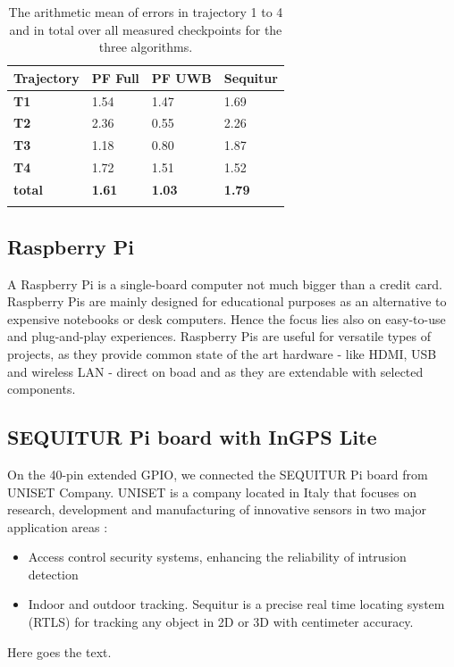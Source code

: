 \begin{table}
\caption{The arithmetic mean of errors in trajectory 1 to 4 and in total over all measured checkpoints for the three algorithms.}
\label{tab:arithmetic_errors}
\centering
\begin{tabular}{l l l l}
\toprule
\textbf{Trajectory} & \textbf{PF Full} & \textbf{PF UWB} & \textbf{Sequitur}\\
\midrule
\textbf{T1} & 1.54 & 1.47 & 1.69\\
\textbf{T2} & 2.36 & 0.55 & 2.26\\
\textbf{T3} & 1.18 & 0.80 & 1.87\\
\textbf{T4} & 1.72 & 1.51 & 1.52\\
\midrule
\textbf{total}  & \textbf{1.61} & \textbf{1.03} & \textbf{1.79}\\
\bottomrule\\
\end{tabular}
\end{table}




\subsection{Raspberry Pi}
A Raspberry Pi is a single-board computer not much bigger than a credit card. Raspberry Pis are mainly designed for educational purposes as an alternative to expensive notebooks or desk computers. Hence the focus lies also on easy-to-use and plug-and-play experiences. Raspberry Pis are useful for versatile types of projects, as they provide common state of the art hardware - like HDMI, USB and wireless LAN - direct on boad and as they are extendable with selected components.



\subsection{SEQUITUR Pi board with InGPS Lite}
On the 40-pin extended GPIO, we connected the SEQUITUR Pi board from UNISET Company. UNISET is a company located in Italy that focuses on research, development and manufacturing of innovative sensors in two major application areas \cite{Uniset}:

\begin{itemize}
\item Access control security systems, enhancing the reliability of intrusion detection
\item Indoor and outdoor tracking. Sequitur is a precise real time locating system (RTLS) for tracking any object in 2D or 3D with centimeter accuracy.
\end{itemize}
Here goes the text.

